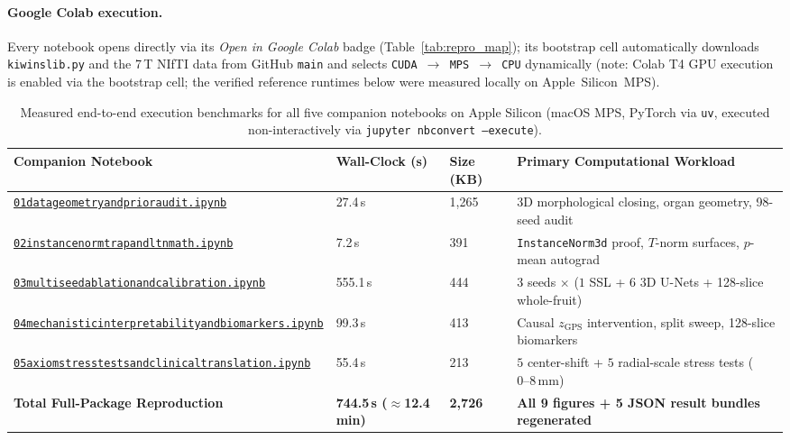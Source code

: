 \documentclass[10pt,a4paper]{article}
\renewcommand{\_}{\origunderscore\allowbreak}
\newcommand{\ghblob}{https://github.com/arvidl/BMED365-2027/blob/main}
\newcommand{\repodir}{Lab4-Comp-Imag/Kiwi-challenge/docs/neurosymbolic-report}
\newcommand{\nbref}[1]{\href{\ghblob/\repodir/notebooks/#1}{\texttt{#1}}}
\begin{document}
\paragraph{Google Colab execution.}
Every notebook opens directly via its \emph{Open in Google Colab} badge (Table~\ref{tab:repro_map}); its bootstrap cell automatically downloads \texttt{kiwi\_ns\_lib.py} and the 7\,T NIfTI data from GitHub \texttt{main} and selects \texttt{CUDA $\to$ MPS $\to$ CPU} dynamically (note: Colab T4 GPU execution is enabled via the bootstrap cell; the verified reference runtimes below were measured locally on Apple~Silicon~MPS).

\begin{table}[H]
\centering
\caption[Measured Apple Silicon MPS execution runtimes (Notebooks 01--05)]{Measured end-to-end execution benchmarks for all five companion notebooks on Apple Silicon (macOS MPS, PyTorch via \texttt{uv}, executed non-interactively via \texttt{jupyter nbconvert --execute}).}
\label{tab:runtimes}
{\footnotesize
\setlength{\tabcolsep}{4pt}
\renewcommand{\arraystretch}{1.22}
\begin{tabularx}{\textwidth}{L{5.6cm} C{1.9cm} C{1.5cm} Y}
\toprule
{}\textbf{Companion Notebook} & \textbf{Wall-Clock (s)} & \textbf{Size (KB)} & \textbf{Primary Computational Workload} \\
\midrule
\nbref{01\_data\_geometry\_and\_prior\_audit.ipynb} & 27.4\,s & 1,265 & 3D morphological closing, organ geometry, 98-seed audit \\
\nbref{02\_instancenorm\_trap\_and\_ltn\_math.ipynb} & 7.2\,s & 391 & \texttt{InstanceNorm3d} proof, $T$-norm surfaces, $p$-mean autograd \\
\nbref{03\_multiseed\_ablation\_and\_calibration.ipynb} & 555.1\,s & 444 & $3$ seeds $\times$ ($1$ SSL + $6$ 3D U-Nets + 128-slice whole-fruit) \\
\nbref{04\_mechanistic\_interpretability\_and\_biomarkers.ipynb} & 99.3\,s & 413 & Causal $z_{\text{GPS}}$ intervention, split sweep, 128-slice biomarkers \\
\nbref{05\_axiom\_stress\_tests\_and\_clinical\_translation.ipynb} & 55.4\,s & 213 & $5$ center-shift + $5$ radial-scale stress tests ($0\text{--}8\,\text{mm}$) \\
\midrule
\textbf{Total Full-Package Reproduction} & \textbf{744.5\,s ($\approx$12.4\,min)} & \textbf{2,726} & \textbf{All 9 figures + 5 JSON result bundles regenerated} \\
\bottomrule
\end{tabularx}
}
\end{table}
\end{document}

